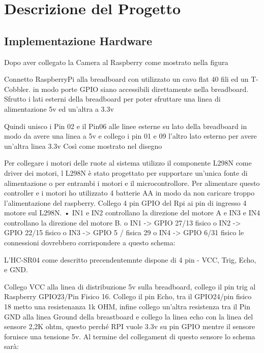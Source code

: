 \chapter{Descrizione del Progetto}

\ifpdf
    \graphicspath{{Chapter3/Figs/Raster/}{Chapter3/Figs/PDF/}{Chapter3/Figs/}}
\else
    \graphicspath{{Chapter3/Figs/Vector/}{Chapter3/Figs/}}
\fi
\section{Implementazione Hardware}
Dopo aver collegato la Camera al Raspberry come mostrato nella figura

Connetto RaspberryPi alla breadboard con utilizzato un cavo flat 40 fili ed un T-Cobbler. 
in modo   porte GPIO siano accessibili direttamente nella breadboard. Sfrutto i lati esterni della breadboard per poter sfruttare una linea di alimentazione 5v ed un'altra a 3.3v

Quindi unisco i Pin 02 e il Pin06 alle linee esterne su lato della breadboard in modo da avere una linea a 5v e collego i pin 01 e 09 l’altro lato esterno per avere un’altra linea 3.3v
Così come mostrato nel disegno

Per collegare i motori delle ruote al sistema utilizzo il componente L298N come driver dei motori, l L298N è stato progettato per supportare un’unica fonte di alimentazione o per entrambi i motori e il microcontrollore. Per alimentare questo controller e i motori ho utilizzato 4 batterie AA in modo da non caricare troppo l’alimentazione del raspberry.
Collego  4 pin GPIO del Rpi ai pin di ingresso 4 motore sul L298N. 
•	IN1 e IN2 controllano la direzione del motore A e IN3 e IN4 controllano la direzione del motore B. 
o	IN1 -> GPIO 27/13 fisico
o	IN2 -> GPIO 22/15 fisico
o	IN3 -> GPIO 5 / fisica 29
o	IN4 -> GPIO 6/31 fisico
le connessioni dovrebbero corrispondere a questo schema:

L'HC-SR04 come descritto precendentemnte dispone di 4 pin - VCC, Trig, Echo, e GND.

Collego VCC alla linea di distribuzione 5v sulla breadboard, collego il pin trig al Raspberry GPIO23/Pin Fisico 16. Collego il pin Echo, tra il GPIO24/pin fisico 18 metto una resistenanza 1k OHM, infine collego un’altra resistenza tra il Pin GND alla linea Ground della breastboard e collego la linea echo con la linea del sensore 2,2K ohtm, questo perché RPI vuole 3.3v su pin GPIO  mentre il sensore fornisce una tensione 5v.
Al termine del collegament di questo sensore lo schema sarà:

